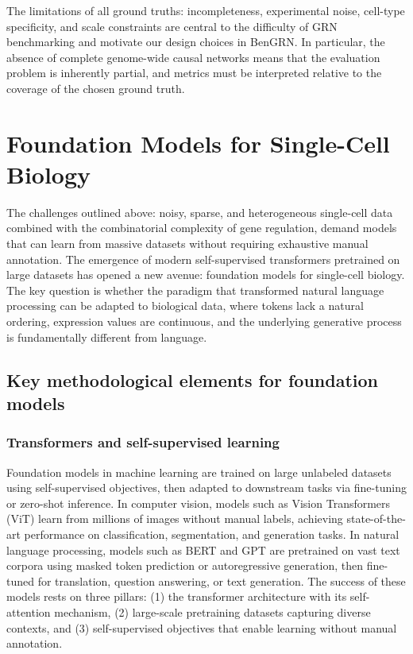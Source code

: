 \bigskip
The limitations of all ground truths: incompleteness, experimental noise, cell-type specificity,
and scale constraints are central to the difficulty of \gls{GRN} benchmarking and motivate our
design choices in BenGRN. In particular, the absence of complete genome-wide causal networks means
that the evaluation problem is inherently partial, and metrics must be interpreted relative to the
coverage of the chosen ground truth.

\section{Foundation Models for Single-Cell Biology}
\label{sec:foundations}

The challenges outlined above: noisy, sparse, and heterogeneous single-cell data combined with
the combinatorial complexity of gene regulation, demand models that can learn from massive datasets
without requiring exhaustive manual annotation. The emergence of modern self-supervised
transformers pretrained on large datasets has opened a new avenue: foundation models for
single-cell biology. The key question is whether the paradigm that transformed natural language
processing can be adapted to biological data, where tokens lack a natural ordering, expression
values are continuous, and the underlying generative process is fundamentally different from
language.

\subsection{Key methodological elements for foundation models}

\subsubsection{Transformers and self-supervised learning}
Foundation models in machine learning are trained on large unlabeled datasets using self-supervised
objectives, then adapted to downstream tasks via fine-tuning or zero-shot inference. In computer
vision, models such as Vision Transformers (ViT) \cite{dosovitskiyImageWorth16x162021} learn from
millions of images without manual labels, achieving state-of-the-art performance on classification,
segmentation, and generation tasks. In natural language processing, models such as BERT
\cite{devlinBERTPretrainingDeep2019} and GPT \cite{brownLanguageModelsAre2020} are pretrained on
vast text corpora using masked token prediction or autoregressive generation, then fine-tuned for
translation, question answering, or text generation. The success of these models rests on three
pillars: (1) the transformer architecture with its self-attention mechanism, (2) large-scale
pretraining datasets capturing diverse contexts, and (3) self-supervised objectives that enable
learning without manual annotation.

